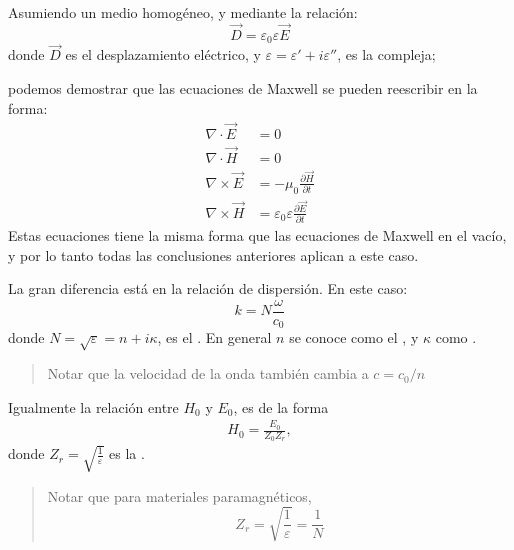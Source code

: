 \documentclass[letterpaper,10pt,english]{jupyterBook}
\begin{document}
\sphinxAtStartPar
Asumiendo un medio homogéneo, y mediante la relación:
\label{equation:2_ondas_EM_en_la_materia/2_ondas_EM_en_la_materia:b2c40785-0c66-4052-8e9d-99a169aba12c}\begin{equation}
\vec{D} = \varepsilon_0\varepsilon\vec{E}
\end{equation}
\sphinxAtStartPar
donde \(\vec{D}\) es el desplazamiento eléctrico, y \(\varepsilon = \varepsilon' + i\varepsilon''\), es la  compleja;

\sphinxAtStartPar
podemos demostrar que las ecuaciones de Maxwell se pueden reescribir en la forma:
\begin{align*}
\nabla\cdot\vec{E} &= 0 \\
\nabla\cdot\vec{H} &= 0 \\
\nabla\times\vec{E} &= -\mu_0\frac{\partial \vec{H}}{\partial t} \\
\nabla\times\vec{H} &= \varepsilon_0 \varepsilon\frac{\partial\vec{E}}{\partial t}
\end{align*}
\sphinxAtStartPar
Estas ecuaciones tiene la misma forma que las ecuaciones de Maxwell en el vacío, y por lo tanto todas las conclusiones anteriores aplican a este caso.

\sphinxAtStartPar
La gran diferencia está en la relación de dispersión. En este caso:
\label{equation:2_ondas_EM_en_la_materia/2_ondas_EM_en_la_materia:2137b04e-17a0-42d3-a2a1-38b8d139a2e6}\begin{equation}
k = N \frac{\omega}{c_0}
\end{equation}
\sphinxAtStartPar
donde \(N = \sqrt{\varepsilon} = n +i\kappa\), es el . En general \(n\) se conoce como el , y \(\kappa\) como .
\begin{quote}

\sphinxAtStartPar
Notar que la velocidad de la onda también cambia a \(c = c_0/n\)
\end{quote}

\sphinxAtStartPar
Igualmente la relación entre \(H_0\) y \(E_0\), es de la forma
\begin{equation*}
\begin{split}H_0 = \frac{E_0}{Z_0Z_r},\end{split}
\end{equation*}
\sphinxAtStartPar
donde \(Z_r = \sqrt{\frac{1}{\varepsilon}}\) es la .
\begin{quote}

\sphinxAtStartPar
Notar que para materiales paramagnéticos,
\begin{equation*}Z_r = \sqrt{\frac{1}{\varepsilon}} = \frac{1}{N}\end{equation*}\end{quote}
\end{document}
